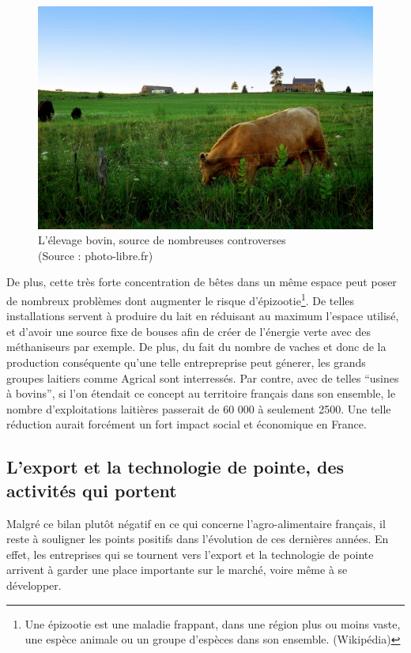 \documentclass[a4paper,12pt]{report}
\begin{document}
			\begin{figure}[!h]
				\centering
				\includegraphics[scale=1]{Illustrations/Vache.jpg}
				\caption{L'élevage bovin, source de nombreuses controverses\\(Source : photo-libre.fr)}
				\label{Vache}
			\end{figure}
			
			 De plus, cette très forte concentration de bêtes dans un même espace peut poser de nombreux problèmes dont augmenter le risque d'épizootie\footnote{Une épizootie est une maladie frappant, dans une région plus ou moins vaste, une espèce animale ou un groupe d'espèces dans son ensemble. (Wikipédia)}. De telles installations servent à produire du lait en réduisant au maximum l’espace utilisé, et d’avoir une source fixe de bouses afin de créer de l’énergie verte avec des méthaniseurs par exemple. De plus, du fait du nombre de vaches et donc de la production conséquente qu’une telle entrepreprise peut génerer, les grands groupes laitiers comme Agrical sont interressés. Par contre, avec de telles “usines à bovins”, si l’on étendait ce concept au territoire français dans son ensemble, le nombre d’exploitations laitières passerait de 60 000 à seulement 2500. Une telle réduction aurait forcément un fort impact social et économique en France.
			

		\subsection{L'export et la technologie de pointe, des activités qui portent}
			Malgré ce bilan plutôt négatif en ce qui concerne l’agro-alimentaire français, il reste à souligner les points positifs dans l’évolution de ces dernières années. En effet, les entreprises qui se tournent vers l’export et la technologie de pointe arrivent à garder une place importante sur le marché, voire même à se développer.
			
\end{document}
